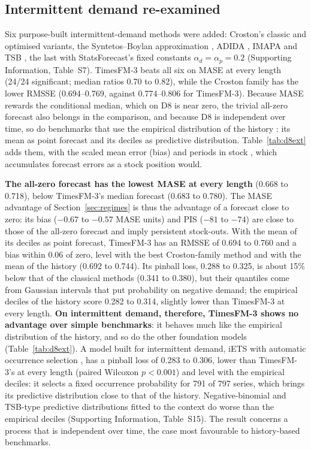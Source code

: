 \documentclass[ASNA]{USG}
\newcommand{\pkg}[1]{\textsf{#1}}
\providecommand{\sectionref}[1]{Section~\ref{#1}}
\providecommand{\tableref}[1]{Table~\ref{#1}}
\begin{document}
\subsection{Intermittent demand re-examined}
\label{sec:d8-extended}

Six purpose-built intermittent-demand methods were added: Croston's classic and optimised variants, the
Syntetos--Boylan approximation \citep{syntetos2005accuracy}, ADIDA \citep{nikolopoulos2011adida}, IMAPA
\citep{petropoulos2015imapa} and TSB \citep{teunter2011tsb}, the last with \pkg{StatsForecast}'s fixed
constants $\alpha_d = \alpha_p = 0.2$ (Supporting Information, Table~S7). TimesFM-3 beats all six on MASE at
every length (24/24 significant; median ratios 0.70 to 0.82), while the Croston family has the lower RMSSE
(0.694--0.769, against 0.774--0.806 for TimesFM-3). Because MASE rewards the conditional median, which on D8
is near zero, the trivial all-zero forecast also belongs in the comparison, and because D8 is independent
over time, so do benchmarks that use the empirical distribution of the history
\citep{willemain2004bootstrap}: its mean as point forecast and its deciles as predictive distribution.
\tableref{tab:d8ext} adds them, with the scaled mean error (bias) and periods in stock
\citep[PIS;][]{wallstrom2010pis}, which accumulates forecast errors as a stock position would.



\textbf{The all-zero forecast has the lowest MASE at every length} (0.668 to 0.718), below TimesFM-3's
median forecast (0.683 to 0.780). The MASE advantage of \sectionref{sec:regimes} is thus the advantage of a
forecast close to zero: its bias ($-0.67$ to $-0.57$ MASE units) and PIS ($-81$ to $-74$) are close to those
of the all-zero forecast and imply persistent stock-outs. With the mean of its deciles as point forecast,
TimesFM-3 has an RMSSE of 0.694 to 0.760 and a bias within 0.06 of zero, level with the best Croston-family
method and with the mean of the history (0.692 to 0.744). Its pinball loss, 0.288 to 0.325, is about 15\%
below that of the classical methods (0.341 to 0.380), but their quantiles come from Gaussian intervals that
put probability on negative demand; the empirical deciles of the history score 0.282 to 0.314, slightly
lower than TimesFM-3 at every length. \textbf{On intermittent demand, therefore, TimesFM-3 shows no advantage
over simple benchmarks}: it behaves much like the empirical distribution of the history, and so do the other
foundation models (\tableref{tab:d8ext}). A model built for intermittent demand, iETS with automatic
occurrence selection \citep{svetunkov2023iets}, has a pinball loss of 0.283 to 0.306, lower than
TimesFM-3's at every length (paired Wilcoxon $p < 0.001$) and level with the empirical deciles: it selects
a fixed occurrence probability for 791 of 797 series, which brings its predictive distribution close to
that of the history. Negative-binomial and TSB-type predictive distributions fitted to the context do
worse than the empirical deciles (Supporting Information, Table~S15). The result concerns a process that
is independent over time, the
case most favourable to history-based benchmarks.
\end{document}
